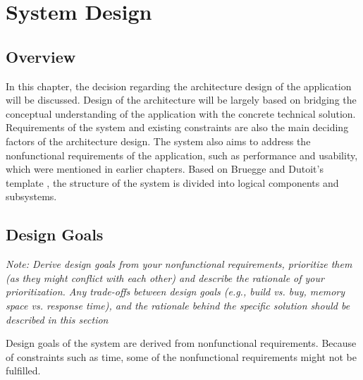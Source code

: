 \chapter{System Design}


\section{Overview}


In this chapter, the decision regarding the architecture design of the application will be discussed.
Design of the architecture will be largely based on bridging the conceptual understanding of the application with the concrete technical solution.
Requirements of the system and existing constraints are also the main deciding factors of the architecture design.
The system also aims to address the nonfunctional requirements of the application, such as performance and usability, which were mentioned in earlier chapters.
Based on Bruegge and Dutoit's template \cite{bruegge2004object}, the structure of the system is divided into logical components and subsystems.

\section{Design Goals}

\textit{Note: Derive design goals from your nonfunctional requirements, prioritize them (as they might conflict with each other) and describe the rationale of your prioritization. Any trade-offs between design goals (e.g., build vs. buy, memory space vs. response time),
and the rationale behind the specific solution should be described in this section}

Design goals of the system are derived from nonfunctional requirements.
Because of constraints such as time, some of the nonfunctional requirements might not be fulfilled.


